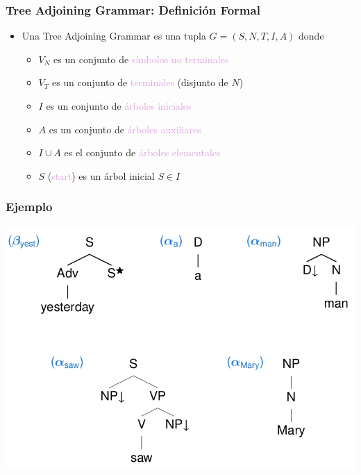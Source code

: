 \documentclass[compress,color=usenames]{beamer}
\newcommand{\mH}[1]{\textcolor{Plum}{#1}}
\begin{document}
\begin{frame}
\frametitle{Tree Adjoining Grammar: Definici\'on Formal}

\begin{itemize}

\item Una Tree Adjoining Grammar es una tupla $G = (S , N, T, I, A)$ donde\pause

\begin{itemize}
\item $V_N$ es un conjunto de \mH{s\'imbolos no terminales}

\item $V_T$ es un conjunto de \mH{terminales} (disjunto de $N$)\pause

\item $I$ es un conjunto de \mH{\'arboles iniciales} 

\item $A$ es un conjunto de \mH{\'arboles auxiliares}\pause

\item $I \cup A$ es el conjunto de \mH{\'arboles elementales}\pause

\item $S$ (\mH{start}) es un \'arbol inicial $S \in I$

\end{itemize}

\end{itemize}
\end{frame}

\begin{frame}
\frametitle{Ejemplo}

\begin{center}
\includegraphics[scale=.45]{pics/pic2-27.jpg} 
\end{center}
\end{frame}
\end{document}
